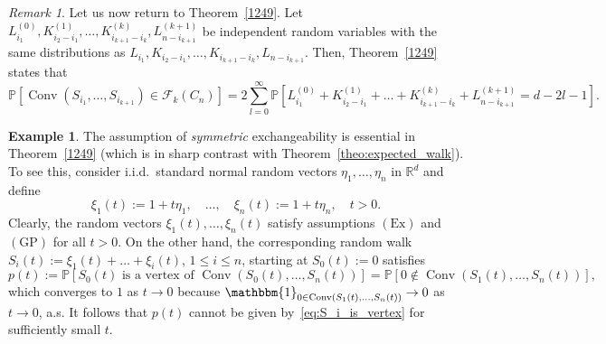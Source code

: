 \documentclass[12pt, reqno]{amsart}
\theoremstyle{plain}
\theoremstyle{definition}
\newtheorem{example}[theorem]{Example}
\theoremstyle{remark}
\newtheorem{remark}[theorem]{Remark}
\begin{document}
\begin{remark}
Let us now return to Theorem~\ref{1249}. Let $L_{i_1}^{(0)},K_{i_2-i_1}^{(1)}, \ldots, K_{i_{k+1}-i_k}^{(k)}, L_{n-i_{k+1}}^{(k+1)}$ be independent random variables with the same distributions as $L_{i_1},K_{i_2-i_1}, \ldots, K_{i_{k+1}-i_k}, L_{n-i_{k+1}}$. Then, Theorem~\ref{1249} states that
$$
{\mathbb{P}}[{\mathop{\mathrm{Conv}}\nolimits}(S_{i_1},\ldots,S_{i_{k+1}}) \in \mathcal F_k(C_n)] =
2 \sum_{l=0}^\infty {\mathbb{P}}[L_{i_1}^{(0)} + K_{i_2-i_1}^{(1)} +  \ldots + K_{i_{k+1}-i_k}^{(k)} + L_{n-i_{k+1}}^{(k+1)} = d-2l-1].
$$
\end{remark}
\begin{example}\label{ex:non_symm_RW}
The assumption of \textit{symmetric} exchangeability is essential in Theorem~\ref{1249} (which is in sharp contrast with Theorem~\ref{theo:expected_walk}).  To see this,  consider i.i.d.\ standard normal random vectors  $\eta_1,\ldots,\eta_n$ in ${\mathbb{R}}^d$ and define
$$
\xi_1(t) := 1 + t\eta_1,\quad \ldots, \quad \xi_n(t) := 1 + t\eta_n, \quad t>0.
$$
Clearly, the random vectors $\xi_1(t),\ldots,\xi_n(t)$ satisfy assumptions $(\text{Ex})$ and $(\text{GP})$ for all $t>0$. On the other hand, the corresponding random walk $S_i(t):= \xi_1(t)+\ldots+\xi_i(t)$, $1\leq i\leq n$, starting at $S_0(t):=0$ satisfies
$$
p(t) := {\mathbb{P}}[S_0(t) \text{ is a vertex of } {\mathop{\mathrm{Conv}}\nolimits}(S_0(t),\ldots,S_n(t))] = {\mathbb{P}}[0\notin {\mathop{\mathrm{Conv}}\nolimits}(S_1(t),\ldots,S_n(t))],
$$
which converges to $1$ as $t\to 0$ because ${\mathbbm{1}}_{0 \in {\mathop{\mathrm{Conv}}\nolimits}(S_1(t),\ldots,S_n(t))} \to 0$ as $t\to 0$, a.s. It follows that $p(t)$ cannot be given by~\eqref{eq:S_i_is_vertex} for sufficiently small $t$.
\end{example}
\end{document}
